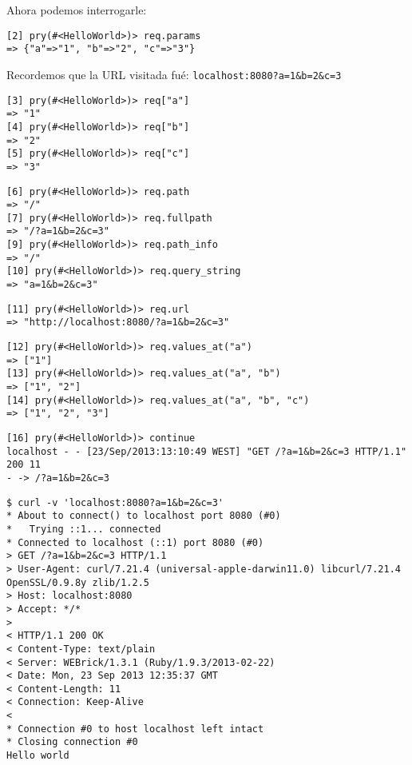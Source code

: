 Ahora podemos interrogarle:
\begin{verbatim}
[2] pry(#<HelloWorld>)> req.params
=> {"a"=>"1", "b"=>"2", "c"=>"3"}
\end{verbatim}

Recordemos que la URL visitada fué: \verb'localhost:8080?a=1&b=2&c=3'
\begin{verbatim}
[3] pry(#<HelloWorld>)> req["a"]
=> "1"
[4] pry(#<HelloWorld>)> req["b"]
=> "2"
[5] pry(#<HelloWorld>)> req["c"]
=> "3"
\end{verbatim}

\begin{verbatim}
[6] pry(#<HelloWorld>)> req.path
=> "/"
[7] pry(#<HelloWorld>)> req.fullpath
=> "/?a=1&b=2&c=3"
[9] pry(#<HelloWorld>)> req.path_info
=> "/"
[10] pry(#<HelloWorld>)> req.query_string
=> "a=1&b=2&c=3"
\end{verbatim}


\begin{verbatim}
[11] pry(#<HelloWorld>)> req.url
=> "http://localhost:8080/?a=1&b=2&c=3"
\end{verbatim}


\begin{verbatim}
[12] pry(#<HelloWorld>)> req.values_at("a")
=> ["1"]
[13] pry(#<HelloWorld>)> req.values_at("a", "b")
=> ["1", "2"]
[14] pry(#<HelloWorld>)> req.values_at("a", "b", "c")
=> ["1", "2", "3"]
\end{verbatim}

\begin{verbatim}
[16] pry(#<HelloWorld>)> continue
localhost - - [23/Sep/2013:13:10:49 WEST] "GET /?a=1&b=2&c=3 HTTP/1.1" 200 11
- -> /?a=1&b=2&c=3
\end{verbatim}

\begin{verbatim}
$ curl -v 'localhost:8080?a=1&b=2&c=3'
* About to connect() to localhost port 8080 (#0)
*   Trying ::1... connected
* Connected to localhost (::1) port 8080 (#0)
> GET /?a=1&b=2&c=3 HTTP/1.1
> User-Agent: curl/7.21.4 (universal-apple-darwin11.0) libcurl/7.21.4 OpenSSL/0.9.8y zlib/1.2.5
> Host: localhost:8080
> Accept: */*
> 
< HTTP/1.1 200 OK 
< Content-Type: text/plain
< Server: WEBrick/1.3.1 (Ruby/1.9.3/2013-02-22)
< Date: Mon, 23 Sep 2013 12:35:37 GMT
< Content-Length: 11
< Connection: Keep-Alive
< 
* Connection #0 to host localhost left intact
* Closing connection #0
Hello world
\end{verbatim}


